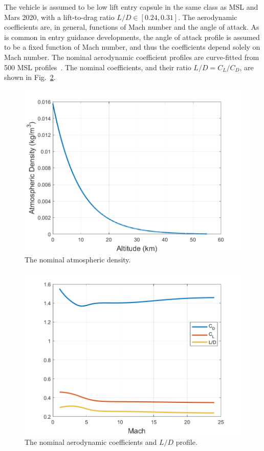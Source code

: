 The vehicle is assumed to be low lift entry capsule in the same class as MSL and Mars 2020, with a lift-to-drag ratio $L/D\in[0.24, 0.31]$. The aerodynamic coefficients are, in general, functions of Mach number and the angle of attack. As is common in entry guidance developments, the angle of attack profile is assumed to be a fixed function of Mach number, and thus the coefficients depend solely on Mach number. The nominal aerodynamic coefficient profiles are curve-fitted from 500 MSL profiles~\cite{joel_dissertation}. The nominal coefficients, and their ratio $L/D = C_L/C_D$, are shown in Fig.~\ref{Fig:AeroCoeffNominal}.
\begin{figure}[h!]
	\centering
	\includegraphics[width=1\textwidth]{Images/DensityNominal}
	\caption{The nominal atmospheric density.}
	\label{Fig:DensityNominal}
\end{figure}
\begin{figure}[h!]
	\centering
	\includegraphics[width=1\textwidth]{Images/CoeffNominal}
	\caption{The nominal aerodynamic coefficients and $L/D$ profile.}
	\label{Fig:AeroCoeffNominal}
\end{figure}

